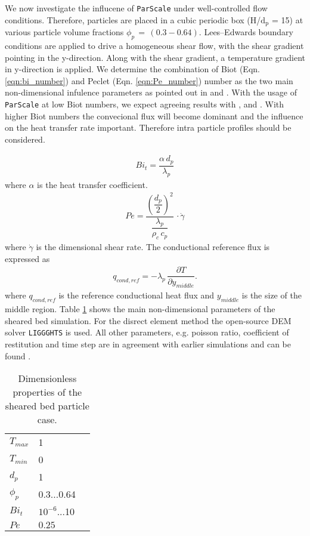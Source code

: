 \documentclass{particles2015}
\begin{document}
We now investigate the influcene of \texttt{ParScale} under well-controlled flow conditions. Therefore, particles are placed in a cubic periodic box (H/$\text{d}_\text{p}$ = 15) at various particle volume fractions $\phi_p \, =  \, (0.3 - 0.64)$. Lees–Edwards boundary conditions are applied to drive a homogeneous shear flow, with the shear gradient pointing in the y-direction. Along with the shear gradient, a temperature gradient in y-direction is applied. We determine the combination of Biot (Eqn. \ref{eqn:bi_number}) and Peclet (Eqn. \ref{eqn:Pe_number}) number as the two main non-dimensional infulence parameters as pointed out in \cite{Mohan2014} and \cite{Chialvo2012}. With the usage of \texttt{ParScale} at low Biot numbers, we expect agreeing results with \cite{Mohan2014}, \cite{Chialvo2012} and \cite{Vargas2001}. With higher Biot numbers the convecional flux will become dominant and the influence on the heat transfer rate important. Therefore intra particle profiles should be considered.

\begin{align}
Bi_t = \dfrac{\alpha\, d_p}{\lambda_p}
\label{eqn:bi_number}
\end{align}
where $\alpha$ is the heat transfer coefficient.
\begin{align}
Pe = \dfrac{\left(\dfrac{d_p}{2}\right)^2}{\dfrac{\lambda_p}{\rho_c \, c_p}} \, \cdot \dot{\gamma}
\label{eqn:Pe_number}
\end{align}  
where $\dot{\gamma}$ is the dimensional shear rate. The conductional reference flux is expressed as \cite{Chialvo2012}
\begin{align}
q_{cond,ref} = - \lambda_p \, \dfrac{\partial T}{\partial y_{middle}}.
\end{align}
where $q_{cond,ref}$ is the reference conductional heat flux and $y_{middle}$ is the size of the middle region. Table \ref{tab:properties_sheard_bed} shows the main non-dimensional parameters of the sheared bed simulation. For the disrect element method the open-source DEM solver \texttt{LIGGGHTS}\textsuperscript{\textregistered} is used. All other parameters, e.g. poisson ratio, coefficient of restitution and time step are in agreement with earlier simulations and can be found \cite{Mohan2014}.

\begin{table}[h]
  \centering 
  \caption{Dimensionless properties of the sheared bed particle case.}
   \begin{tabular}{llr}
      \hline 
        $T_{max}$				& 1 & \\
        $T_{min}$				& 0 & \\
        $d_p$					& 1 & \\
        $\phi_p$				& 0.3...0.64 &\\
        $Bi_t$					& $10^{-6}$...10 & \\
        $Pe$ 					& $0.25$& \\
      \hline      
       \end{tabular}
   \setlength{\belowcaptionskip}{12pt}
   \label{tab:properties_sheard_bed}
\end{table}
\end{document}
